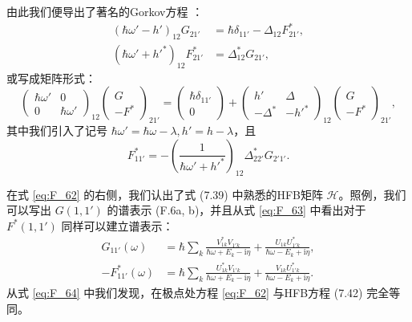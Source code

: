 由此我们便导出了著名的Gorkov方程 \cite{Go58}：
\begin{align*}
(\hbar\omega'-h')_{12}G_{21'} & =\hbar\delta_{11'}-\Delta_{12}F^{*}_{21'},\\
(\hbar\omega'+h'^{*})_{12}F^{*}_{21'} & =\Delta^{*}_{12}G_{21'},
\end{align*}
或写成矩阵形式：
\begin{equation}
\begin{pmatrix}\hbar\omega' & 0\\
0 & \hbar\omega'
\end{pmatrix}_{12}\begin{pmatrix}G\\
-F^{*}
\end{pmatrix}_{21'}=\begin{pmatrix}\hbar\delta_{11'}\\
0
\end{pmatrix}+\begin{pmatrix}h' & \Delta\\
-\Delta^{*} & -h'^{*}
\end{pmatrix}_{12}\begin{pmatrix}G\\
-F^{*}
\end{pmatrix}_{21'},\label{eq:F_62}
\end{equation}
其中我们引入了记号 $\hbar\omega'=\hbar\omega-\lambda,h'=h-\lambda$，且
\begin{equation}
F^{*}_{11'}=-\left(\frac{1}{\hbar\omega'+h'^{*}}\right)_{12}\Delta^{*}_{22'}G_{2'1'}.\label{eq:F_63}
\end{equation}

在式 \ref{eq:F_62} 的右侧，我们认出了式 (7.39) 中熟悉的HFB矩阵 $\mathcal{H}$。照例，我们可以写出
$G(1,1')$ 的谱表示 (F.6a, b)，并且从式 \ref{eq:F_63} 中看出对于 $F^{*}(1,1')$
同样可以建立谱表示：
\begin{align}
G_{11'}(\omega) & =\hbar\sum_{k}\frac{V^{*}_{1k}V_{1'k}}{\hbar\omega+E_{k}-\mathrm{i}\eta}+\frac{U_{1k}U^{*}_{1'k}}{\hbar\omega-E_{k}+\mathrm{i}\eta},\nonumber \\
-F^{*}_{11'}(\omega) & =\hbar\sum_{k}\frac{U^{*}_{1k}V_{1'k}}{\hbar\omega+E_{k}-\mathrm{i}\eta}+\frac{V_{1k}U^{*}_{1'k}}{\hbar\omega-E_{k}+\mathrm{i}\eta}.\label{eq:F_64}
\end{align}
从式 \ref{eq:F_64} 中我们发现，在极点处方程 \ref{eq:F_62} 与HFB方程 (7.42) 完全等同。

